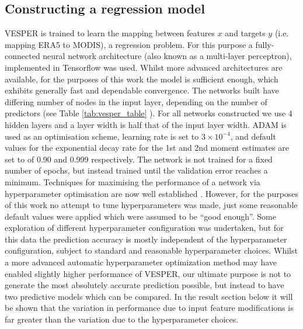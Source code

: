 \documentclass[hess, twostagejnl]{copernicus}
\begin{document}
\subsection{Constructing a regression model}
VESPER is trained to learn the mapping between features $x$ and targets $y$ (i.e. mapping ERA5 to MODIS), a regression problem. For this purpose a fully-connected neural network architecture (also known as a multi-layer perceptron), implemented in Tensorflow \citep{2016arXiv160304467A} was used. Whilst more advanced architectures are available, for the purposes of this work the model is sufficient enough, which exhibits generally fast and dependable convergence. The networks built have differing number of nodes in the input layer, depending on the number of predictors (see Table \ref{tab:vesper_table} ). For all networks constructed we use 4 hidden layers and a layer width is half that of the input layer width. ADAM \citep{2014adam} is used as an optimisation scheme, learning rate is set to $3 \times 10^{-4}$, and default values for the exponential decay rate for the 1st and 2nd moment estimates are set to of 0.90 and 0.999 respectively. The network is not trained for a fixed number of epochs, but instead trained until the validation error reaches a minimum. Techniques for maximising the performance of a network via hyperparameter optimisation are now well established \citep{HPO1,HPO2}. However, for the purposes of this work no attempt to tune hyperparameters was made, just some reasonable default values were applied which were assumed to be “good enough”. Some exploration of different hyperparameter configuration was undertaken, but for this data the prediction accuracy is mostly independent of the hyperparameter configuration, subject to standard and reasonable hyperparameter choices. Whilst a more advanced automatic hyperparameter optimization method may have enabled slightly higher performance of VESPER, our ultimate purpose is not to generate the most absolutely accurate prediction possible, but instead to have two predictive models which can be compared. In the result section below it will be shown that the variation in performance due to input feature modifications is far greater than the variation due to the hyperparameter choices. \newline 
\end{document}
